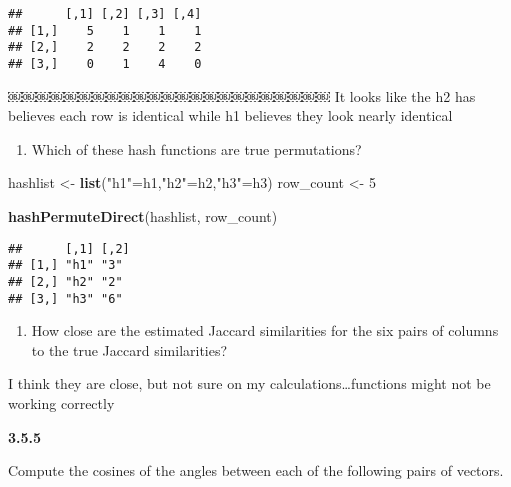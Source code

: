 \documentclass[]{article}
\newenvironment{Shaded}{\begin{snugshade}}{\end{snugshade}}
\newcommand{\KeywordTok}[1]{\textcolor[rgb]{0.13,0.29,0.53}{\textbf{{#1}}}}
\newcommand{\DataTypeTok}[1]{\textcolor[rgb]{0.13,0.29,0.53}{{#1}}}
\newcommand{\DecValTok}[1]{\textcolor[rgb]{0.00,0.00,0.81}{{#1}}}
\newcommand{\StringTok}[1]{\textcolor[rgb]{0.31,0.60,0.02}{{#1}}}
\newcommand{\NormalTok}[1]{{#1}}
\begin{document}
\begin{verbatim}
##      [,1] [,2] [,3] [,4]
## [1,]    5    1    1    1
## [2,]    2    2    2    2
## [3,]    0    1    4    0
\end{verbatim}

￼￼￼￼￼￼￼￼￼￼￼￼￼￼￼￼￼￼￼￼￼￼￼ It looks like the h2 has believes each row is
identical while h1 believes they look nearly identical

\begin{enumerate}
\def\labelenumi{(\alph{enumi})}
\setcounter{enumi}{1}
\itemsep1pt\parskip0pt
\item
  Which of these hash functions are true permutations?
\end{enumerate}

\begin{Shaded}
\begin{Highlighting}[]
\NormalTok{hashlist <-}\StringTok{ }\KeywordTok{list}\NormalTok{(}\StringTok{"h1"}\NormalTok{=h1,}\StringTok{"h2"}\NormalTok{=h2,}\StringTok{"h3"}\NormalTok{=h3)}
\NormalTok{row_count <-}\StringTok{ }\DecValTok{5}

\KeywordTok{hashPermuteDirect}\NormalTok{(hashlist, row_count)}
\end{Highlighting}
\end{Shaded}

\begin{verbatim}
##      [,1] [,2]
## [1,] "h1" "3" 
## [2,] "h2" "2" 
## [3,] "h3" "6"
\end{verbatim}

\begin{enumerate}
\def\labelenumi{(\alph{enumi})}
\setcounter{enumi}{2}
\itemsep1pt\parskip0pt
\item
  How close are the estimated Jaccard similarities for the six pairs of
  columns to the true Jaccard similarities?
\end{enumerate}

I think they are close, but not sure on my calculations\ldots{}functions
might not be working correctly

\textbf{3.5.5}

Compute the cosines of the angles between each of the following pairs of
vectors.

\begin{Shaded}
\end{Shaded}
\end{document}
